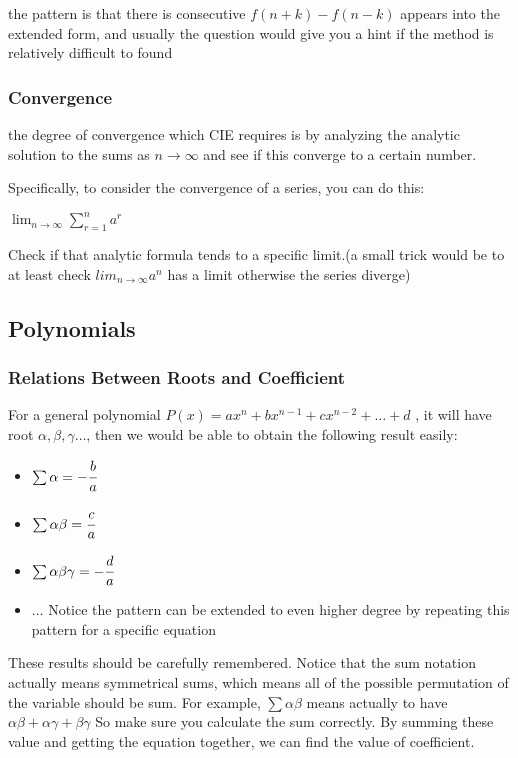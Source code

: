 \documentclass[]{article}
\begin{document}
the pattern is that there is consecutive \(f(n+k) - f(n-k)\) appears
into the extended form, and usually the question would give you a hint
if the method is relatively difficult to found

\subsubsection{Convergence}\label{header-n201}

the degree of convergence which CIE requires is by analyzing the
analytic solution to the sums as \(n \rightarrow \infty\) and see if
this converge to a certain number.

Specifically, to consider the convergence of a series, you can do this:

\(\lim_{n\rightarrow \infty} \sum^n_{r=1} a^r\)

Check if that analytic formula tends to a specific limit.(a small trick
would be to at least check \(lim_{n\rightarrow \infty} a^n\) has a limit
otherwise the series diverge)

\subsection{Polynomials}\label{header-n206}

\subsubsection{Relations Between Roots and
Coefficient}\label{header-n207}

For a general polynomial
\(P(x) = ax^n + bx^{n-1} + cx^{n-2} + \dots + d\) , it will have root
\(\alpha, \beta, \gamma \dots\), then we would be able to obtain the
following result easily:

\begin{itemize}
\item
  \(\sum \alpha = -\cfrac{b}{a}\)
\item
  \(\sum \alpha\beta = \cfrac{c}{a}\)
\item
  \(\sum \alpha \beta\gamma = -\cfrac{d}{a}\)
\item
  \(\dots\) Notice the pattern can be extended to even higher degree by
  repeating this pattern for a specific equation
\end{itemize}

These results should be carefully remembered. Notice that the sum
notation actually means symmetrical sums, which means all of the
possible permutation of the variable should be sum. For example,
\(\sum \alpha \beta \) means actually to have
\(\alpha \beta + \alpha \gamma + \beta \gamma\) So make sure you
calculate the sum correctly. By summing these value and getting the
equation together, we can find the value of coefficient.
\end{document}
